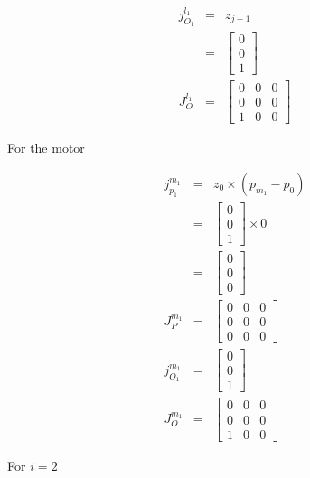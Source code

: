 \documentclass{article}
\begin{document}
\begin{eqnarray*}
	j_{O_1}^{l_1} &=& z_{j-1} \\
		      &=& \begin{bmatrix} 0 \\ 0 \\ 1 \end{bmatrix} \\
      	J_O^{l_1} &=& \begin{bmatrix}0 & 0 & 0 \\ 0 & 0 & 0 \\ 1 & 0 & 0 \end{bmatrix}
\end{eqnarray*}

For the motor

\begin{eqnarray*}
	j_{p_1}^{m_1} &=& z_0 \times \left( p_{m_1} - p_0 \right) \\
		      &=& \begin{bmatrix} 0 \\ 0 \\ 1 \end{bmatrix} \times 0 \\
		      &=& \begin{bmatrix} 0 \\ 0 \\ 0 \end{bmatrix} \\
      	J_{P}^{m_1} &=& \begin{bmatrix} 0 & 0 & 0 \\ 0 & 0 & 0 \\ 0 & 0 & 0  \end{bmatrix} \\
      	j_{O_1}^{m_1} &=& \begin{bmatrix} 0 \\ 0 \\ 1 \end{bmatrix} \\
      	J_{O}^{m_1} &=& \begin{bmatrix} 0 & 0 & 0 \\ 0 & 0 & 0 \\ 1 & 0 & 0 \end{bmatrix}
\end{eqnarray*}

For $i = 2$
\end{document}
